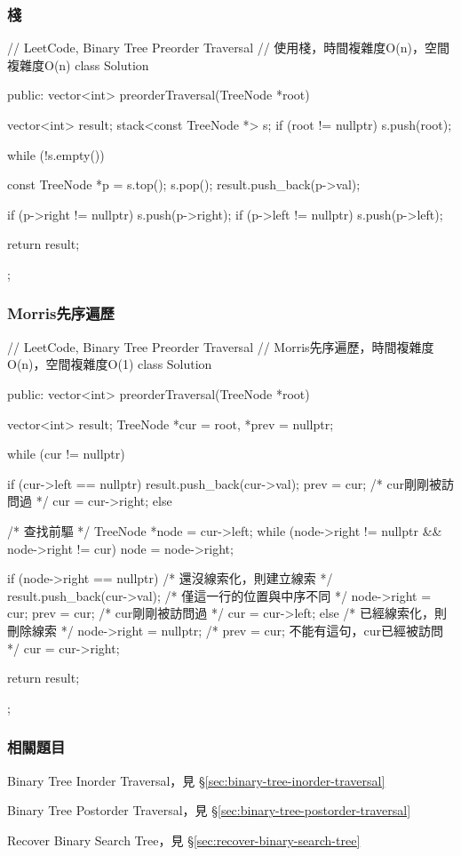 \subsubsection{棧}
\begin{Code}
// LeetCode, Binary Tree Preorder Traversal
// 使用棧，時間複雜度O(n)，空間複雜度O(n)
class Solution {
public:
    vector<int> preorderTraversal(TreeNode *root) {
        vector<int> result;
        stack<const TreeNode *> s;
        if (root != nullptr) s.push(root);

        while (!s.empty()) {
            const TreeNode *p = s.top();
            s.pop();
            result.push_back(p->val);

            if (p->right != nullptr) s.push(p->right);
            if (p->left != nullptr) s.push(p->left);
        }
        return result;
    }
};
\end{Code}


\subsubsection{Morris先序遍歷}
\begin{Code}
// LeetCode, Binary Tree Preorder Traversal
// Morris先序遍歷，時間複雜度O(n)，空間複雜度O(1)
class Solution {
public:
    vector<int> preorderTraversal(TreeNode *root) {
        vector<int> result;
        TreeNode *cur = root, *prev = nullptr;

        while (cur != nullptr) {
            if (cur->left == nullptr) {
                result.push_back(cur->val);
                prev = cur; /* cur剛剛被訪問過 */
                cur = cur->right;
            } else {
                /* 查找前驅 */
                TreeNode *node = cur->left;
                while (node->right != nullptr && node->right != cur)
                    node = node->right;

                if (node->right == nullptr) { /* 還沒線索化，則建立線索 */
                    result.push_back(cur->val); /* 僅這一行的位置與中序不同 */
                    node->right = cur;
                    prev = cur; /* cur剛剛被訪問過 */
                    cur = cur->left;
                } else {    /* 已經線索化，則刪除線索  */
                    node->right = nullptr;
                    /* prev = cur; 不能有這句，cur已經被訪問 */
                    cur = cur->right;
                }
            }
        }
        return result;
    }
};
\end{Code}


\subsubsection{相關題目}
\begindot
\item Binary Tree Inorder Traversal，見 \S \ref{sec:binary-tree-inorder-traversal}
\item Binary Tree Postorder Traversal，見 \S \ref{sec:binary-tree-postorder-traversal}
\item Recover Binary Search Tree，見 \S \ref{sec:recover-binary-search-tree}
\myenddot


